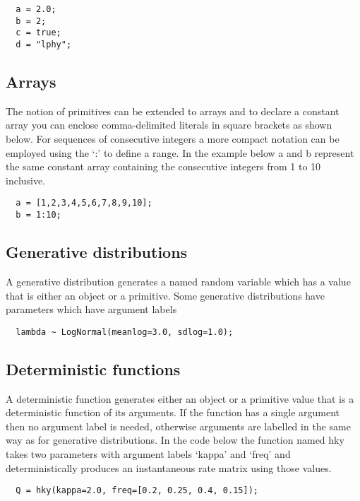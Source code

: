 \documentclass[oneside]{article}
\begin{document}
{\singlespacing
\begin{verbatim}
  a = 2.0;
  b = 2;
  c = true;
  d = "lphy";
\end{verbatim}
}

\subsection{Arrays}

The notion of primitives can be extended to arrays and to declare a constant array you can enclose comma-delimited literals in square brackets as shown below. For sequences of consecutive integers a more compact notation can be employed using the `:' to define a range. In the example below a and b represent the same constant array containing the consecutive integers from 1 to 10 inclusive.

\begin{verbatim}
  a = [1,2,3,4,5,6,7,8,9,10];
  b = 1:10;
\end{verbatim}

\subsection{Generative distributions}

A generative distribution generates a named random variable which has a value that is either an object or a primitive. Some generative distributions have parameters which have argument labels

{\singlespacing
\begin{verbatim}
  lambda ~ LogNormal(meanlog=3.0, sdlog=1.0);
\end{verbatim}
}

\subsection{Deterministic functions}

A deterministic function generates either an object or a primitive value that is a deterministic function of its arguments. If the function has a single argument then no argument label is needed, otherwise arguments are labelled in the same way as for generative distributions. In the code below the function named hky takes two parameters with argument labels `kappa' and `freq' and deterministically produces an instantaneous rate matrix using those values.

{\singlespacing
\begin{verbatim}
  Q = hky(kappa=2.0, freq=[0.2, 0.25, 0.4, 0.15]);
\end{verbatim}
}
\end{document}
